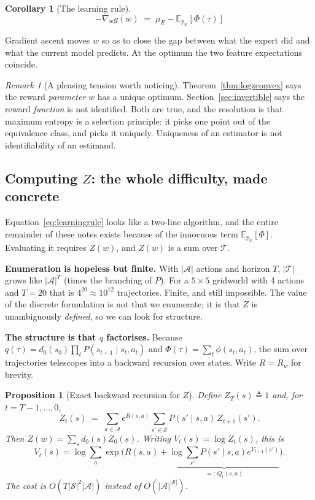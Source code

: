 \documentclass[11pt]{article}
\theoremstyle{plain}
\newtheorem{proposition}[theorem]{Proposition}
\newtheorem{corollary}[theorem]{Corollary}
\theoremstyle{definition}
\theoremstyle{remark}
\newtheorem{remark}[theorem]{Remark}
\renewcommand{\S}{\mathcal{S}}
\newcommand{\A}{\mathcal{A}}
\newcommand{\T}{\mathcal{T}}
\newcommand{\E}{\mathbb{E}}
\begin{document}
\begin{corollary}[The learning rule]
\begin{equation}
\boxed{-\nabla_w g(w) \;=\; \mu_E - \E_{p_w}[\Phi(\tau)]}
\label{eq:learningrule}
\end{equation}
\end{corollary}

Gradient ascent moves $w$ so as to close the gap between what the expert
did and what the current model predicts. At the optimum the two feature
expectations coincide.

\begin{remark}[A pleasing tension worth noticing]
Theorem~\ref{thm:logzconvex} says the reward \emph{parameter} $w$ has a
unique optimum. Section~\ref{sec:invertible} says the reward
\emph{function} is not identified. Both are true, and the resolution is
that maximum entropy is a selection principle: it picks one point out of
the equivalence class, and picks it uniquely. Uniqueness of an estimator
is not identifiability of an estimand.
\end{remark}

\subsection{Computing $Z$: the whole difficulty, made concrete}
\label{sec:computingz}

Equation~\eqref{eq:learningrule} looks like a two-line algorithm, and the
entire remainder of these notes exists because of the innocuous term
$\E_{p_w}[\Phi]$. Evaluating it requires $Z(w)$, and $Z(w)$ is a sum over
$\T$.

\textbf{Enumeration is hopeless but finite.} With $|\A|$ actions and
horizon $T$, $|\T|$ grows like $|\A|^T$ (times the branching of $P$). For
a $5\times5$ gridworld with 4 actions and $T=20$ that is $4^{20}\approx
10^{12}$ trajectories. Finite, and still impossible. The value of the
discrete formulation is not that we enumerate; it is that $Z$ is
unambiguously \emph{defined}, so we can look for structure.

\textbf{The structure is that $q$ factorises.} Because $q(\tau) =
d_0(s_0)\prod_t P(s_{t+1}\mid s_t,a_t)$ and $\Phi(\tau) =
\sum_t\phi(s_t,a_t)$, the sum over trajectories telescopes into a backward
recursion over states. Write $R=R_w$ for brevity.

\begin{proposition}[Exact backward recursion for $Z$]\label{prop:backwardz}
Define $Z_T(s) \triangleq 1$ and, for $t=T-1,\ldots,0$,
\begin{equation}
Z_t(s) \;=\; \sum_{a\in\A} e^{R(s,a)} \sum_{s'\in\S} P(s'\mid s,a)\,Z_{t+1}(s').
\label{eq:backwardz}
\end{equation}
Then $Z(w) = \sum_s d_0(s) Z_0(s)$. Writing $V_t(s) = \log Z_t(s)$, this is
\begin{equation}
V_t(s) = \log\sum_a \exp\Big(R(s,a) + \underbrace{\log\sum_{s'}P(s'\mid
s,a)e^{V_{t+1}(s')}}_{=:\,Q_t(s,a)}\Big).
\label{eq:backwardv}
\end{equation}
The cost is $O(T|\S|^2|\A|)$ instead of $O(|\A|^{|\S|})$.
\end{proposition}
\end{document}
